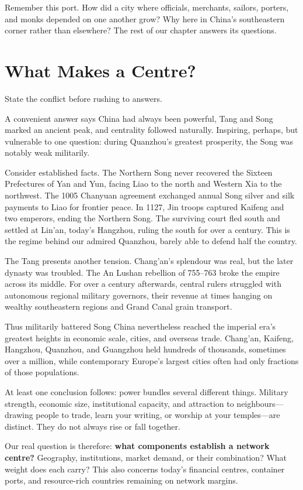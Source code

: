 Remember this port. How did a city where officials, merchants, sailors, porters, and monks depended on one another grow? Why here in China's southeastern corner rather than elsewhere? The rest of our chapter answers its questions.

\section{What Makes a Centre?}
State the conflict before rushing to answers.

A convenient answer says China had always been powerful, Tang and Song marked an ancient peak, and centrality followed naturally. Inspiring, perhaps, but vulnerable to one question: during Quanzhou's greatest prosperity, the Song was notably weak militarily.

Consider established facts. The Northern Song never recovered the Sixteen Prefectures of Yan and Yun, facing Liao to the north and Western Xia to the northwest. The 1005 Chanyuan agreement exchanged annual Song silver and silk payments to Liao for frontier peace. In 1127, Jin troops captured Kaifeng and two emperors, ending the Northern Song. The surviving court fled south and settled at Lin'an, today's Hangzhou, ruling the south for over a century. This is the regime behind our admired Quanzhou, barely able to defend half the country.

The Tang presents another tension. Chang'an's splendour was real, but the later dynasty was troubled. The An Lushan rebellion of 755--763 broke the empire across its middle. For over a century afterwards, central rulers struggled with autonomous regional military governors, their revenue at times hanging on wealthy southeastern regions and Grand Canal grain transport.

Thus militarily battered Song China nevertheless reached the imperial era's greatest heights in economic scale, cities, and overseas trade. Chang'an, Kaifeng, Hangzhou, Quanzhou, and Guangzhou held hundreds of thousands, sometimes over a million, while contemporary Europe's largest cities often had only fractions of those populations.

At least one conclusion follows: power bundles several different things. Military strength, economic size, institutional capacity, and attraction to neighbours---drawing people to trade, learn your writing, or worship at your temples---are distinct. They do not always rise or fall together.

Our real question is therefore: \textbf{what components establish a network centre?} Geography, institutions, market demand, or their combination? What weight does each carry? This also concerns today's financial centres, container ports, and resource-rich countries remaining on network margins.

